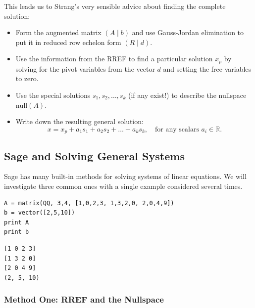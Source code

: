 \documentclass[10pt,]{book}
\theoremstyle{plain}
\numberwithin{equation}{section}
\begin{document}
      This leads us to Strang's very sensible advice about finding the
      complete solution:
\begin{itemize}
\item{}
        Form the augmented matrix \(\left( A \mid b \right)\) and use
        Gauss-Jordan elimination to put it in reduced row echelon form
        \(\left( R \mid d \right)\).
      \item{}
        Use the information from the RREF to find a particular solution
        \(x_p\) by solving for the pivot variables from the vector
        \(d\) and setting the free variables to zero.
      \item{}
        Use the special solutions \(s_1, s_2, \dots, s_k\)
        (if any exist!) to describe the nullspace \(\mathrm{null}(A)\).
      \item{}
        Write down the resulting general solution:
        \[
          x = x_p + a_1 s_1 + a_2 s_2 + \dots + a_k s_k,
          \quad \text{for any scalars } a_i \in \mathbb{R}.
        \]
      \end{itemize}
\typeout{************************************************}
\typeout{************************************************}
\subsection[Sage and Solving General Systems]{Sage and Solving General Systems}\label{subsection-76}

      Sage has many built-in methods for solving systems of linear equations.
      We will investigate three common ones with a single example considered
      several times.
\begin{lstlisting}[style=sageinput]
A = matrix(QQ, 3,4, [1,0,2,3, 1,3,2,0, 2,0,4,9])
b = vector([2,5,10])
print A
print b
\end{lstlisting}
\begin{lstlisting}[style=sageoutput]
[1 0 2 3]
[1 3 2 0]
[2 0 4 9]
(2, 5, 10)
\end{lstlisting}
\typeout{************************************************}
\typeout{************************************************}
\subsubsection[Method One: RREF and the Nullspace]{Method One: RREF and the Nullspace}\label{subsubsection-36}
\end{document}
